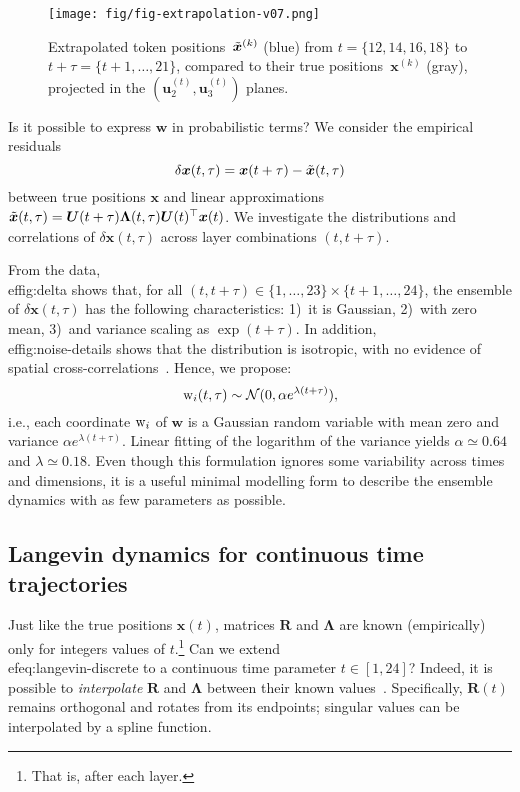 \documentclass{article} %
\def\rw{{\textnormal{w}}}
\def\rvw{{\mathbf{w}}}
\def\vu{{\bm{u}}}
\def\vw{{\bm{w}}}
\def\vx{{\bm{x}}}
\def\mR{{\bm{R}}}
\def\mU{{\bm{U}}}
\begin{document}
\begin{figure}[ht]
\begin{center}
\texttt{[image: fig/fig-extrapolation-v07.png]}
\end{center}
\caption{
Extrapolated token positions~$\Tilde{\vx}^{(k)}$ (blue) from $t = \{ 12,14,16,18\}$ to $t+\tau = \{ t+1,\dots,21\}$, compared to their true positions~$\vx^{(k)}$ (gray), projected in the $( \vu_2^{(t)},\vu_3^{(t)})$ planes.
}
\label{fig:extrapolation}
\end{figure}

Is it possible to express $\vw$ in probabilistic terms?
We consider the empirical residuals 
\[
\delta \vx(t,\tau) = \vx(t+\tau) - \Tilde{\vx}(t,\tau) 
\]
between true positions $\vx$ and linear approximations $\Tilde{\vx}(t,\tau) = \mU(t+\tau) \mathbf{\Lambda}(t,\tau) \mU(t)^{\top} \vx(t)$. 
We investigate the distributions and correlations of $\delta \vx(t,\tau)$ across layer combinations $(t,t+\tau)$.

From the data, \\ef{fig:delta} shows that, for all $(t,t+\tau) \in \{ 1, \dots, 23 \} \times \{ t+1, \dots, 24 \}$, the ensemble of $\delta \vx(t,\tau)$ has the following characteristics: 1)~it is Gaussian, 2)~with zero mean, 3)~and variance scaling as $\exp(t+\tau)$.
In addition, \\ef{fig:noise-details} shows that the distribution is isotropic, with no evidence of spatial cross-correlations~. Hence, we propose:
\begin{equation} \label{eq:noise}
    \rw_i (t,\tau) \sim \mathcal{N}(0, \alpha e^{\lambda (t+\tau)}),
\end{equation}
i.e., each coordinate $\rw_i$ of $\rvw$ is a Gaussian random variable with mean zero and variance $\alpha e^{\lambda(t+\tau)}$.
Linear fitting of the logarithm of the variance yields $\alpha \simeq 0.64$ and $\lambda \simeq 0.18$.
Even though this formulation ignores some variability across times and dimensions, it is a useful minimal modelling form to describe the ensemble dynamics with as few parameters as possible.



\subsection{Langevin dynamics for continuous time trajectories}
Just like the true positions $\vx(t)$, matrices $\mR$ and $\mathbf{\Lambda}$ are known (empirically) only for integers values of $t$.\footnote{That is, after each layer.}
Can we extend \\ef{eq:langevin-discrete} to a continuous time parameter $t \in [1,24]$?
Indeed, it is possible to \emph{interpolate} $\mR$ and $\mathbf{\Lambda}$ between their known values~\citep{AbsMahSep2008}.
Specifically, $\mR(t)$ remains orthogonal and rotates from its endpoints; singular values can be interpolated by a spline function.
\end{document}

